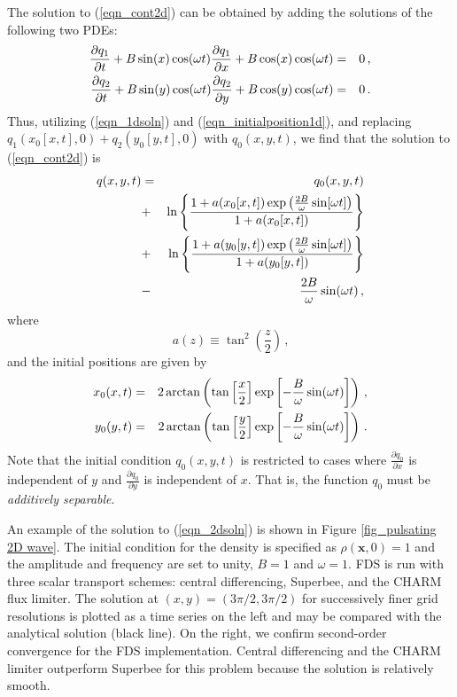\documentclass[11pt]{book}
\begin{document}
The solution to (\ref{eqn_cont2d}) can be obtained by adding the solutions of the following two PDEs:
\begin{eqnarray}
\label{eqn_linearpdes}
\frac{\partial q_1}{\partial t} + B \sin(x) \cos(\omega t) \frac{\partial q_1}{\partial x} + B \cos(x) \cos(\omega t) &=& 0 \,\mbox{,} \vspace{0.3cm} \\
\frac{\partial q_2}{\partial t} + B \sin(y) \cos(\omega t) \frac{\partial q_2}{\partial y} + B \cos(y) \cos(\omega t) &=& 0 \,\mbox{.}
\end{eqnarray}
Thus, utilizing (\ref{eqn_1dsoln}) and (\ref{eqn_initialposition1d}), and replacing $q_1(x_0[x,t],0) + q_2(y_0[y,t],0)$ with $q_0(x,y,t)$, we find that the solution to (\ref{eqn_cont2d}) is
\begin{eqnarray}
\label{eqn_2dsoln}
q(x,y,t) &=& q_0(x,y,t) \nonumber\vspace{0.3cm}\\
&+& \ln \left\{ \frac{1 + a(x_0[x,t]) \exp \left( \frac{2B}{\omega} \sin[\omega t] \right)}{1 + a(x_0[x,t])} \right\} \nonumber\vspace{0.3cm}\\
&+& \ln \left\{ \frac{1 + a(y_0[y,t]) \exp \left( \frac{2B}{\omega} \sin[\omega t] \right)}{1 + a(y_0[y,t])} \right\} \nonumber\vspace{0.3cm}\\
&-& \frac{2B}{\omega} \sin(\omega t) \,\mbox{,}
\end{eqnarray}
where
\begin{equation}
\label{eqn_a}
a(z) \equiv \tan^2\left(\frac{z}{2}\right) \,\mbox{,}
\end{equation}
and the initial positions are given by
\begin{eqnarray}
\label{eqn_initpos2d}
x_0(x,t) &=& 2 \arctan\left( \tan\left[\frac{x}{2}\right] \exp\left[-\frac{B}{\omega}\sin(\omega t)\right] \right) \,\mbox{,} \vspace{0.3cm}\\
y_0(y,t) &=& 2 \arctan\left( \tan\left[\frac{y}{2}\right] \exp\left[-\frac{B}{\omega}\sin(\omega t)\right] \right) \,\mbox{.}
\end{eqnarray}
Note that the initial condition $q_0(x,y,t)$ is restricted to cases where $\frac{\partial q_0}{\partial x}$ is independent of $y$ and $\frac{\partial q_0}{\partial y}$ is independent of $x$.  That is, the function $q_0$ must be \emph{additively separable}.

An example of the solution to (\ref{eqn_2dsoln}) is shown in Figure \ref{fig_pulsating 2D wave}. The initial condition for the density is specified as $\rho(\mathbf{x},0) = 1$ and the amplitude and frequency are set to unity, $B=1$ and $\omega=1$.  FDS is run with three scalar transport schemes: central differencing, Superbee, and the CHARM flux limiter. The solution at $(x,y) = (3\pi/2, 3\pi/2)$ for successively finer grid resolutions is plotted as a time series on the left and may be compared with the analytical solution (black line). On the right, we confirm second-order convergence for the FDS implementation.  Central differencing and the CHARM limiter outperform Superbee for this problem because the solution is relatively smooth.
\end{document}
